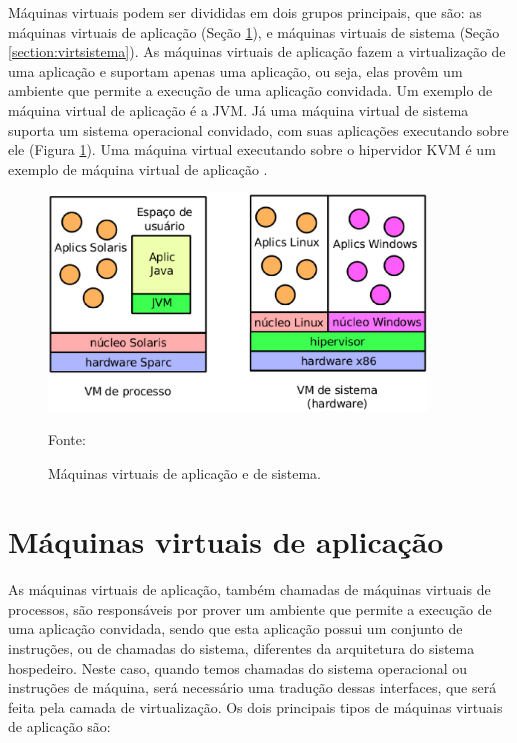 Máquinas virtuais podem ser divididas em dois grupos principais, que são: as máquinas virtuais de aplicação (Seção \ref{section:virtaplicacao}), 
e máquinas virtuais de sistema (Seção \ref{section:virtsistema}). As máquinas virtuais de aplicação fazem a virtualização de uma 
aplicação e suportam apenas uma aplicação, ou seja, elas provêm um ambiente que permite a execução de
uma aplicação convidada. Um exemplo de máquina virtual de aplicação é a \ac{JVM}. Já uma máquina virtual de sistema suporta um sistema
operacional convidado, com suas aplicações executando sobre ele (Figura \ref{fig:vms_tipos}). Uma máquina virtual executando sobre o 
hipervidor \ac{KVM} é um exemplo de máquina virtual de aplicação \cite{laureano2008}.

\begin{figure}[h!]
 \centering
 \includegraphics[width=380px]{img/vms_tipos.eps}
 \caption{Máquinas virtuais de aplicação e de sistema.}
 \label{fig:vms_tipos}
 Fonte: \citet{laureano2008}
\end{figure}

\section{Máquinas virtuais de aplicação}
\label{section:virtaplicacao}

As máquinas virtuais de aplicação, também chamadas de máquinas virtuais de processos, são responsáveis por prover um ambiente que permite 
a execução de uma aplicação convidada, sendo que esta aplicação possui um conjunto de instruções, ou de chamadas do sistema, diferentes da 
arquitetura do sistema hospedeiro. Neste caso, quando temos chamadas do sistema operacional ou instruções de máquina, será necessário uma 
tradução dessas interfaces, que será feita pela camada de virtualização. Os dois principais tipos de máquinas virtuais de aplicação são:

